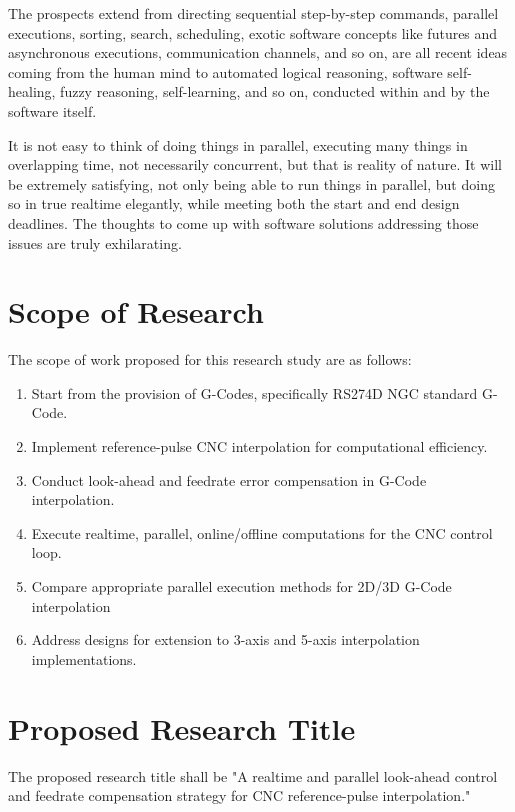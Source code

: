 The prospects extend from directing sequential step-by-step commands, parallel executions, sorting, search, scheduling, exotic software concepts like futures and asynchronous executions, communication channels, and so on, are all recent ideas coming from the human mind to automated logical reasoning, software self-healing, fuzzy reasoning, self-learning, and so on, conducted within and by the software itself. 
\vspace*{1\baselineskip}
	
It is not easy to think of doing things in parallel, executing many things in overlapping time, not necessarily concurrent, but that is reality of nature. It will be extremely satisfying, not only being able to run things in parallel, but doing so in true realtime elegantly, while meeting both the start and end design deadlines. The thoughts to come up with software solutions addressing those issues are truly exhilarating.    

\clearpage
\pagebreak
\section{Scope of Research}

The scope of work proposed for this research study are as follows:
\begin{enumerate}
	\item Start from the provision of G-Codes, specifically RS274D NGC standard G-Code.
	\item Implement reference-pulse CNC interpolation for computational efficiency.
	\item Conduct look-ahead and feedrate error compensation in G-Code interpolation.
	\item Execute realtime, parallel, online/offline computations for the CNC control loop.
	\item Compare appropriate parallel execution methods for 2D/3D G-Code interpolation  
	\item Address designs for extension to 3-axis and 5-axis interpolation implementations.
\end{enumerate}

\section{Proposed Research Title}

The proposed research title shall be "A realtime and parallel look-ahead control and feedrate compensation strategy for  CNC reference-pulse interpolation." 

